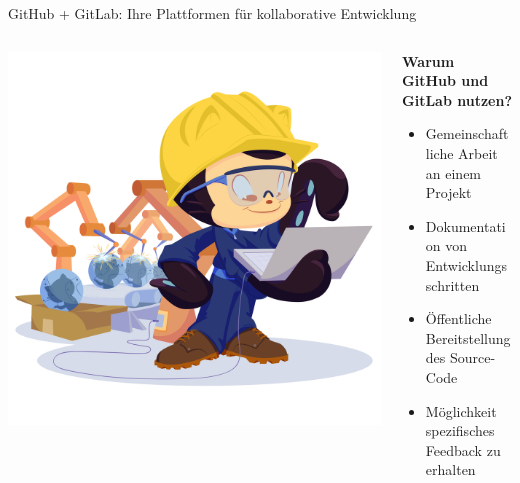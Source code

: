 \documentclass[compress,aspectratio=169]{beamer}
\begin{document}
	\begin{frame}{GitHub + GitLab: Ihre Plattformen für kollaborative Entwicklung}
		\label{pg:lastpage} %
		\begin{columns}
			\begin{column}{0.4\textwidth}
				\includegraphics[width=\textwidth]{assets/manufacturetocat.png}
			\end{column}
			\begin{column}{0.6\textwidth}
				\textbf{Warum GitHub und GitLab nutzen?}
				\begin{itemize}
					\item Gemeinschaftliche Arbeit an einem Projekt
					\item Dokumentation von Entwicklungsschritten
					\item Öffentliche Bereitstellung des Source-Code
					\item Möglichkeit spezifisches Feedback zu erhalten
				\end{itemize}
			\end{column}
		\end{columns}
	\end{frame}

\end{document}
